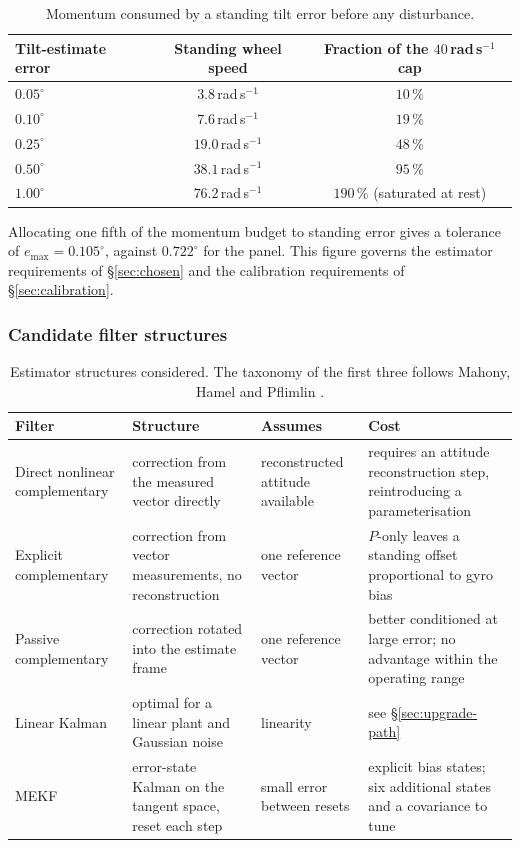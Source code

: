 \begin{table}[htbp]
\centering
\small
\begin{tabular}{@{}lcc@{}}
\toprule
\textbf{Tilt-estimate error} & \textbf{Standing wheel speed}
& \textbf{Fraction of the $40$\,rad\,s$^{-1}$ cap}\\
\midrule
$0.05^\circ$ & $3.8$\,rad\,s$^{-1}$ & $10\,\%$\\
$0.10^\circ$ & $7.6$\,rad\,s$^{-1}$ & $19\,\%$\\
$0.25^\circ$ & $19.0$\,rad\,s$^{-1}$ & $48\,\%$\\
$0.50^\circ$ & $38.1$\,rad\,s$^{-1}$ & $95\,\%$\\
$1.00^\circ$ & $76.2$\,rad\,s$^{-1}$ & $190\,\%$ (saturated at rest)\\
\bottomrule
\end{tabular}
\caption{Momentum consumed by a standing tilt error before any disturbance.}
\label{tab:bias-budget}
\end{table}

Allocating one fifth of the momentum budget to standing error gives a
tolerance of $e_{\max} = 0.105^\circ$, against $0.722^\circ$ for the panel.
This figure governs the estimator requirements of
\S\ref{sec:chosen} and the calibration requirements of
\S\ref{sec:calibration}.

\subsubsection{Candidate filter structures}
\label{sec:candidates}

\begin{table}[htbp]
\centering
\small
\begin{tabular}{@{}lp{34mm}p{25mm}p{40mm}@{}}
\toprule
\textbf{Filter} & \textbf{Structure} & \textbf{Assumes} & \textbf{Cost}\\
\midrule
Direct nonlinear complementary &
  correction from the measured vector directly &
  reconstructed attitude available &
  requires an attitude reconstruction step, reintroducing a
  parameterisation\\[0.4em]
Explicit complementary &
  correction from vector measurements, no reconstruction &
  one reference vector &
  $P$-only leaves a standing offset proportional to gyro bias\\[0.4em]
Passive complementary &
  correction rotated into the estimate frame &
  one reference vector &
  better conditioned at large error; no advantage within the operating
  range\\[0.4em]
Linear Kalman &
  optimal for a linear plant and Gaussian noise &
  linearity &
  see \S\ref{sec:upgrade-path}\\[0.4em]
MEKF &
  error-state Kalman on the tangent space, reset each step &
  small error between resets &
  explicit bias states; six additional states and a covariance to tune\\
\bottomrule
\end{tabular}
\caption{Estimator structures considered. The taxonomy of the first three
follows Mahony, Hamel and Pflimlin \cite{mahony2008complementary}.}
\label{tab:filters}
\end{table}

